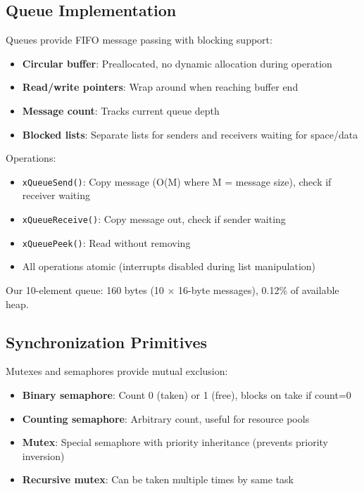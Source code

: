 \documentclass[conference]{IEEEtran}
\begin{document}
\subsection{Queue Implementation}
Queues provide FIFO message passing with blocking support:

\begin{itemize}
    \item \textbf{Circular buffer}: Preallocated, no dynamic allocation during operation
    \item \textbf{Read/write pointers}: Wrap around when reaching buffer end
    \item \textbf{Message count}: Tracks current queue depth
    \item \textbf{Blocked lists}: Separate lists for senders and receivers waiting for space/data
\end{itemize}

Operations:
\begin{itemize}
    \item \texttt{xQueueSend()}: Copy message (O(M) where M = message size), check if receiver waiting
    \item \texttt{xQueueReceive()}: Copy message out, check if sender waiting
    \item \texttt{xQueuePeek()}: Read without removing
    \item All operations atomic (interrupts disabled during list manipulation)
\end{itemize}

Our 10-element queue: 160 bytes (10 × 16-byte messages), 0.12\% of available heap.

\subsection{Synchronization Primitives}
Mutexes and semaphores provide mutual exclusion:

\begin{itemize}
    \item \textbf{Binary semaphore}: Count 0 (taken) or 1 (free), blocks on take if count=0
    \item \textbf{Counting semaphore}: Arbitrary count, useful for resource pools
    \item \textbf{Mutex}: Special semaphore with priority inheritance (prevents priority inversion)
    \item \textbf{Recursive mutex}: Can be taken multiple times by same task
\end{itemize}
\end{document}
